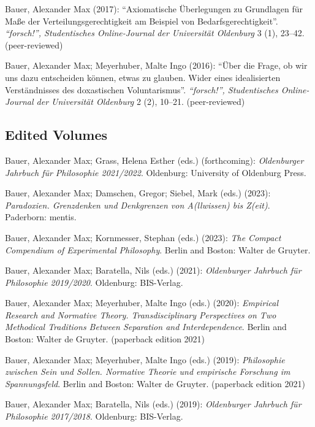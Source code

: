 \documentclass[a4paper,10pt]{article}
\newenvironment{literature}{%
   \parskip6pt\parindent0pt\raggedright
   \def\lititem{\hangindent=1cm\hangafter1}}{%
   \par\ignorespaces}
\begin{document}
\begin{literature}
\lititem Bauer, Alexander Max (2017): \enquote{Axiomatische Überlegungen zu Grundlagen für Maße der Verteilungsgerechtigkeit am Beispiel von Bedarfsgerechtigkeit}. \textit{\enquote{forsch!}, Studentisches Online-Journal der Universität Oldenburg} 3 (1), 23--42. (peer-reviewed)

\lititem Bauer, Alexander Max; Meyerhuber, Malte Ingo (2016): \enquote{Über die Frage, ob wir uns dazu entscheiden können, etwas zu glauben. Wider eines idealisierten Verständnisses des doxastischen Voluntarismus}. \textit{\enquote{forsch!}, Studentisches Online-Journal der Universität Oldenburg} 2 (2), 10--21. (peer-reviewed)
\end{literature}

\subsection*{Edited Volumes}
\begin{literature}
\lititem Bauer, Alexander Max; Grass, Helena Esther (eds.) (forthcoming): \textit{Oldenburger Jahrbuch für Philosophie 2021/2022}. Oldenburg: University of Oldenburg Press.

\lititem Bauer, Alexander Max; Damschen, Gregor; Siebel, Mark (eds.) (2023): \textit{Paradoxien. Grenzdenken und Denkgrenzen von A(llwissen) bis Z(eit)}. Paderborn: mentis.

\lititem Bauer, Alexander Max; Kornmesser, Stephan (eds.) (2023): \textit{The Compact Compendium of Experimental Philosophy}. Berlin and Boston: Walter de Gruyter.

\lititem Bauer, Alexander Max; Baratella, Nils (eds.) (2021): \textit{Oldenburger Jahrbuch für Philosophie 2019/2020}. Oldenburg: BIS-Verlag.

\lititem Bauer, Alexander Max; Meyerhuber, Malte Ingo (eds.) (2020): \textit{Empirical Research and Normative Theory. Transdisciplinary Perspectives on Two Methodical Traditions Between Separation and Interdependence}. Berlin and Boston: Walter de Gruyter. (paperback edition 2021)

\lititem Bauer, Alexander Max; Meyerhuber, Malte Ingo (eds.) (2019): \textit{Philosophie zwischen Sein und Sollen. Normative Theorie und empirische Forschung im Spannungsfeld}. Berlin and Boston: Walter de Gruyter. (paperback edition 2021)

\lititem Bauer, Alexander Max; Baratella, Nils (eds.) (2019): \textit{Oldenburger Jahrbuch für Philosophie 2017/2018}. Oldenburg: BIS-Verlag.
\end{literature}
\end{document}
